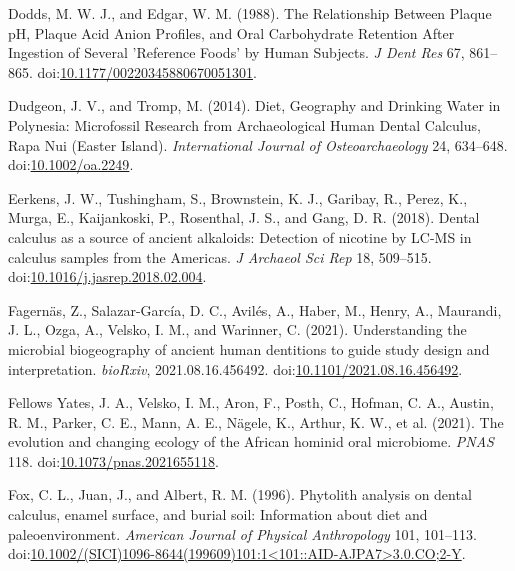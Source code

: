 \documentclass[utf8]{../templates/frontiersSCNS}
\newlength{\cslhangindent}
\newlength{\cslentryspacingunit} %
\newenvironment{CSLReferences}[2] %
 {%
  \setlength{\parindent}{0pt}
  \ifodd #1
  \let\oldpar\par
  \def\par{\hangindent=\cslhangindent\oldpar}
  \fi
  \setlength{\parskip}{#2\cslentryspacingunit}
 }%
 {}
\begin{document}
\begin{CSLReferences}{1}{0}
\leavevmode{}%
Dodds, M. W. J., and Edgar, W. M. (1988). The {Relationship Between Plaque pH}, {Plaque Acid Anion Profiles}, and {Oral Carbohydrate Retention After Ingestion} of {Several} '{Reference Foods}' by {Human Subjects}. \emph{J Dent Res} 67, 861--865. doi:\href{https://doi.org/10.1177/00220345880670051301}{10.1177/00220345880670051301}.

\leavevmode{}%
Dudgeon, J. V., and Tromp, M. (2014). Diet, {Geography} and {Drinking Water} in {Polynesia}: {Microfossil Research} from {Archaeological Human Dental Calculus}, {Rapa Nui} ({Easter Island}). \emph{International Journal of Osteoarchaeology} 24, 634--648. doi:\href{https://doi.org/10.1002/oa.2249}{10.1002/oa.2249}.

\leavevmode{}%
Eerkens, J. W., Tushingham, S., Brownstein, K. J., Garibay, R., Perez, K., Murga, E., Kaijankoski, P., Rosenthal, J. S., and Gang, D. R. (2018). Dental calculus as a source of ancient alkaloids: {Detection} of nicotine by {LC-MS} in calculus samples from the {Americas}. \emph{J Archaeol Sci Rep} 18, 509--515. doi:\href{https://doi.org/10.1016/j.jasrep.2018.02.004}{10.1016/j.jasrep.2018.02.004}.

\leavevmode{}%
Fagernäs, Z., Salazar-García, D. C., Avilés, A., Haber, M., Henry, A., Maurandi, J. L., Ozga, A., Velsko, I. M., and Warinner, C. (2021). Understanding the microbial biogeography of ancient human dentitions to guide study design and interpretation. \emph{bioRxiv}, 2021.08.16.456492. doi:\href{https://doi.org/10.1101/2021.08.16.456492}{10.1101/2021.08.16.456492}.

\leavevmode{}%
Fellows Yates, J. A., Velsko, I. M., Aron, F., Posth, C., Hofman, C. A., Austin, R. M., Parker, C. E., Mann, A. E., Nägele, K., Arthur, K. W., et al. (2021). The evolution and changing ecology of the {African} hominid oral microbiome. \emph{PNAS} 118. doi:\href{https://doi.org/10.1073/pnas.2021655118}{10.1073/pnas.2021655118}.

\leavevmode{}%
Fox, C. L., Juan, J., and Albert, R. M. (1996). Phytolith analysis on dental calculus, enamel surface, and burial soil: {Information} about diet and paleoenvironment. \emph{American Journal of Physical Anthropology} 101, 101--113. doi:\href{https://doi.org/10.1002/(SICI)1096-8644(199609)101:1\%3C101::AID-AJPA7\%3E3.0.CO;2-Y}{10.1002/(SICI)1096-8644(199609)101:1\textless101::AID-AJPA7\textgreater3.0.CO;2-Y}.


\end{CSLReferences}
\end{document}
